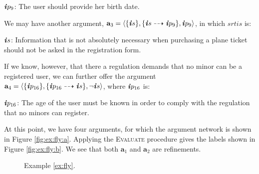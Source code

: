\documentclass[10pt, conference, compsocconf]{IEEEtran}
\begin{document}
\begin{example}
\begin{instexample}
$\textbf{\textit{i}}p_{9}$: \textsf{The user should provide her birth date.}
\end{instexample}

We may have another argument, $\textbf{a}_{3} = \langle \{ \textbf{\textit{i}}s \}, \{ \textbf{\textit{i}}s \dashrightarrow \textbf{\textit{i}}p_{9} \}, \textbf{\textit{i}}p_{9} \rangle$, in which $srt{i}s$ is:

\begin{instexample}
$\textbf{\textit{i}}s$: \textsf{Information that is not absolutely necessary when purchasing a plane ticket should not be asked in the registration form.}
\end{instexample}

If we know, however, that there a regulation demands that no minor can be a registered user, we can further offer the argument $\textbf{a}_{4} = \langle \{ \textbf{\textit{i}}p_{16} \}, \{ \textbf{\textit{i}}p_{16} \dashrightarrow \textbf{\textit{i}}s \}, \neg\textbf{\textit{i}}s \rangle$, where $\textbf{\textit{i}}p_{16}$ is:

\begin{instexample}
$\textbf{\textit{i}}p_{16}$: \textsf{The age of the user must be known in order to comply with the regulation that no minors can register.}
\end{instexample}

At this point, we have four arguments, for which the argument network is shown in Figure \ref{fig:ex:fly:a}. Applying the \textsc{Evaluate} procedure gives the labels shown in Figure \ref{fig:ex:fly:b}. We see that both $\textbf{a}_{1}$ and $\textbf{a}_{2}$ are refinements.
\end{example}

\begin{figure}[t]
\centering	{}%
	\qquad
\caption{Example \ref{ex:fly}.}
\label{fig:ex:fly}
\end{figure}
\end{document}
